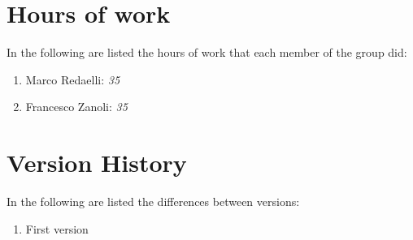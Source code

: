 \documentclass[]{report}
\begin{document}
\section{Hours of work}
In the following are listed the hours of work that each member of the group did:
\begin{enumerate}
	\item Marco Redaelli:  \emph{35}
	\item Francesco Zanoli: \emph{35}
\end{enumerate}
\newpage
\section{Version History}
In the following are listed the differences between versions:
\begin{enumerate}
	\item First version
\end{enumerate}
\end{document}
